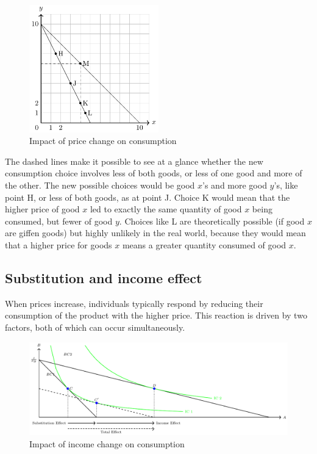 \documentclass[
  12pt,
  oneside]{book}
\theoremstyle{definition}
\theoremstyle{definition}
\theoremstyle{definition}
\theoremstyle{definition}
\theoremstyle{remark}
\begin{document}
\begin{figure}
\centering
\includegraphics[width=0.5\textwidth,height=\textheight]{fig/pricechange.png}
\caption{\label{fig:pricechange} Impact of price change on consumption}
\end{figure}

The dashed lines make it possible to see at a glance whether the new consumption choice involves less of both goods, or less of one good and more of the other. The new possible choices would be good \(x\)'s and more good \(y\)'s, like point H, or less of both goods, as at point J. Choice K would mean that the higher price of good \(x\) led to exactly the same quantity of good \(x\) being consumed, but fewer of good \(y\). Choices like L are theoretically possible (if good \(x\) are giffen goods) but highly unlikely in the real world, because they would mean that a higher price for goods \(x\) means a greater quantity consumed of good \(x\).

\subsection{Substitution and income effect}\label{substitution-and-income-effect}

When prices increase, individuals typically respond by reducing their consumption of the product with the higher price. This reaction is driven by two factors, both of which can occur simultaneously.

\begin{figure}
\centering
\includegraphics[width=1\textwidth,height=\textheight]{fig/hicksdecomp.png}
\caption{\label{fig:hicksdecomp} Impact of income change on consumption}
\end{figure}
\end{document}
